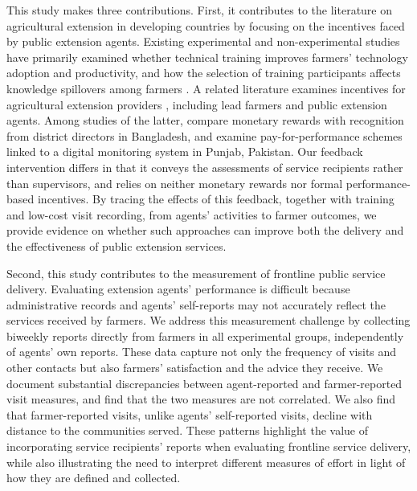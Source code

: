 \documentclass[11pt]{article}
\begin{document}
This study makes three contributions. First, it contributes to the literature on agricultural extension in developing countries by focusing on the incentives faced by public extension agents. Existing experimental and non-experimental studies have primarily examined whether technical training improves farmers' technology adoption and productivity, and how the selection of training participants affects knowledge spillovers among farmers \citep[e.g.,][]{Kondylis2017, Ben2019, Beaman2021}. A related literature examines incentives for agricultural extension providers \citep{Takahashi2020}, including lead farmers \citep{Balew2023, Ben2019, Shikuku2019, Okello2023} and public extension agents. Among studies of the latter, \citet{Alam2024} compare monetary rewards with recognition from district directors in Bangladesh, and \citet{Genicot2022} examine pay-for-performance schemes linked to a digital monitoring system in Punjab, Pakistan. Our feedback intervention differs in that it conveys the assessments of service recipients rather than supervisors, and relies on neither monetary rewards nor formal performance-based incentives. By tracing the effects of this feedback, together with training and low-cost visit recording, from agents' activities to farmer outcomes, we provide evidence on whether such approaches can improve both the delivery and the effectiveness of public extension services. 

Second, this study contributes to the measurement of frontline public service delivery. Evaluating extension agents’ performance is difficult because administrative records and agents’ self-reports may not accurately reflect the services received by farmers. We address this measurement challenge by collecting biweekly reports directly from farmers in all experimental groups, independently of agents’ own reports. These data capture not only the frequency of visits and other contacts but also farmers’ satisfaction and the advice they receive. We document substantial discrepancies between agent-reported and farmer-reported visit measures, and find that the two measures are not correlated. We also find that farmer-reported visits, unlike agents’ self-reported visits, decline with distance to the communities served. These patterns highlight the value of incorporating service recipients’ reports when evaluating frontline service delivery, while also illustrating the need to interpret different measures of effort in light of how they are defined and collected.
\end{document}
